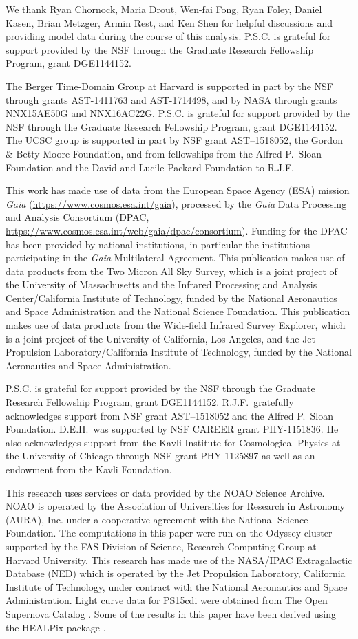 We thank Ryan Chornock, Maria Drout, Wen-fai Fong, Ryan Foley, Daniel Kasen, Brian Metzger, Armin Rest, and Ken Shen for helpful discussions and providing model data during the course of this analysis. P.S.C. is grateful for support provided by the NSF through the Graduate Research Fellowship Program, grant DGE1144152.

The Berger Time-Domain Group at Harvard is supported in part by the NSF through grants AST-1411763 and AST-1714498, and by NASA through grants NNX15AE50G and NNX16AC22G. P.S.C. is grateful for support provided by the NSF
through the Graduate Research Fellowship Program, grant DGE1144152. The UCSC group is supported in part by NSF grant AST--1518052, the Gordon \& Betty Moore Foundation, and from fellowships from the Alfred P.\ Sloan Foundation and the David and Lucile Packard Foundation to R.J.F.

This work has made use of data from the European Space Agency (ESA)
mission {\it Gaia} (\url{https://www.cosmos.esa.int/gaia}), processed by
the {\it Gaia} Data Processing and Analysis Consortium (DPAC,
\url{https://www.cosmos.esa.int/web/gaia/dpac/consortium}). Funding
for the DPAC has been provided by national institutions, in particular
the institutions participating in the {\it Gaia} Multilateral Agreement.
This publication makes use of data products from the Two Micron All Sky Survey,
which is a joint project of the University of Massachusetts and the Infrared Processing
and Analysis Center/California Institute of Technology, funded by the National Aeronautics
and Space Administration and the National Science Foundation. This publication makes use
of data products from the Wide-field Infrared Survey Explorer, which is a joint project of the
University of California, Los Angeles, and the Jet Propulsion Laboratory/California Institute of
Technology, funded by the National Aeronautics and Space Administration.

P.S.C. is grateful for support provided by the NSF
through the Graduate Research Fellowship Program, grant DGE1144152.
R.J.F.\ gratefully acknowledges support from NSF grant AST--1518052 and
the Alfred P.\ Sloan Foundation. D.E.H.\ was supported by NSF CAREER grant
PHY-1151836. He also acknowledges support from the Kavli Institute for
Cosmological Physics at the University of Chicago through NSF grant
PHY-1125897 as well as an endowment from the Kavli Foundation.

This research uses services or data provided by the NOAO Science
Archive. NOAO is operated by the Association of Universities for
Research in Astronomy (AURA), Inc. under a cooperative agreement with
the National Science Foundation. The computations in this paper were
run on the Odyssey cluster supported by the FAS Division of Science,
Research Computing Group at Harvard University. This research has made
use of the NASA/IPAC Extragalactic Database (NED) which is operated by
the Jet Propulsion Laboratory, California Institute of Technology,
under contract with the National Aeronautics and Space Administration.
Light curve data for PS15cdi were obtained from The Open Supernova
Catalog \citep{openSN}. Some of the results in this paper have been
derived using the HEALPix package \citep{gorski+05}.

